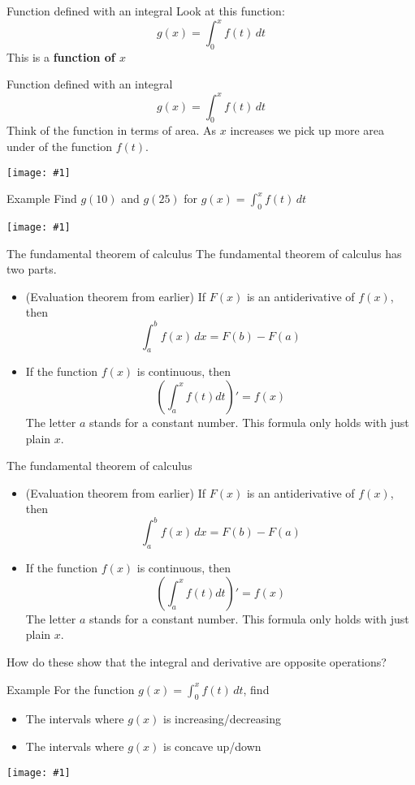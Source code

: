 \documentclass[t]{beamer}
\newcommand{\img}[1]{
\vfill
\begin{center}
\texttt{[image: \#1]}
\end{center}
\vfill
}
\begin{document}
\begin{frame}{Function defined with an integral}
Look at this function:
$$g(x) = \int_0^x f(t) \, dt$$
This is a \textbf{function of $x$}
\end{frame}

\begin{frame}{Function defined with an integral}
$$g(x) = \int_0^x f(t) \, dt$$
Think of the function in terms of area. As $x$ increases we pick up more area under 
of the function $f(t)$.
\img{areafun}
\end{frame}

\begin{frame}{Example}
Find $g(10)$ and $g(25)$ for $g(x) = \int_0^x f(t) \, dt$ 
\img{intfunex}
\end{frame}

\begin{frame}{The fundamental theorem of calculus}
The fundamental theorem of calculus has two parts.
\begin{itemize}
\item (Evaluation theorem from earlier) If $F(x)$ is an antiderivative
of $f(x)$, then
$$\int_a^b f(x) \, dx = F(b) - F(a)$$
\item If the function $f(x)$ is continuous, then
$$\left( \int_a^x f(t) dt \right)' = f(x)$$
The letter $a$ stands for a constant number.  This formula only holds 
with just plain $x$.
\end{itemize}
\end{frame}

\begin{frame}{The fundamental theorem of calculus}
\begin{itemize}
\item (Evaluation theorem from earlier) If $F(x)$ is an antiderivative
of $f(x)$, then
$$\int_a^b f(x) \, dx = F(b) - F(a)$$
\item If the function $f(x)$ is continuous, then
$$\left( \int_a^x f(t) dt \right)' = f(x)$$
The letter $a$ stands for a constant number.  This formula only holds 
with just plain $x$.
\end{itemize}
How do these show that the integral and derivative are opposite operations?
\end{frame}

\begin{frame}{Example}
For the function $g(x) = \int_0^x f(t) \, dt$, find
\begin{itemize}
\item The intervals where $g(x)$ is increasing/decreasing
\item The intervals where $g(x)$ is concave up/down
\end{itemize}
\img{ftocEx}
\end{frame}
\end{document}

